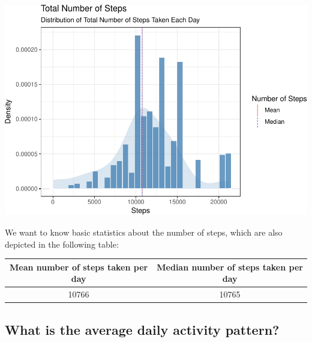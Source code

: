 \documentclass[]{article}
\newenvironment{Shaded}{\begin{snugshade}}{\end{snugshade}}
\newcommand{\KeywordTok}[1]{\textcolor[rgb]{0.13,0.29,0.53}{\textbf{#1}}}
\newcommand{\DataTypeTok}[1]{\textcolor[rgb]{0.13,0.29,0.53}{#1}}
\newcommand{\StringTok}[1]{\textcolor[rgb]{0.31,0.60,0.02}{#1}}
\newcommand{\OtherTok}[1]{\textcolor[rgb]{0.56,0.35,0.01}{#1}}
\newcommand{\OperatorTok}[1]{\textcolor[rgb]{0.81,0.36,0.00}{\textbf{#1}}}
\newcommand{\NormalTok}[1]{#1}
\begin{document}
\begin{center}\includegraphics{figure/histogram-1} \end{center}

We want to know basic statistics about the number of steps, which are
also depicted in the following table:

\begin{Shaded}
\end{Shaded}

\begin{longtable}[]{@{}cc@{}}
\toprule
Mean number of steps taken per day & Median number of steps taken per
day\tabularnewline
\midrule
\endhead
10766 & 10765\tabularnewline
\bottomrule
\end{longtable}

\subsection{What is the average daily activity
pattern?}\label{what-is-the-average-daily-activity-pattern}
\end{document}
